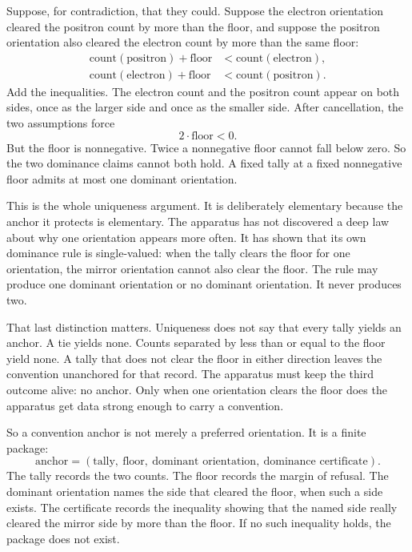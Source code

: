 Suppose, for contradiction, that they could. Suppose the electron orientation
cleared the positron count by more than the floor, and suppose the positron
orientation also cleared the electron count by more than the same floor:
\[
\begin{aligned}
  \mathrm{count}(\text{positron}) + \text{floor}
    &< \mathrm{count}(\text{electron}),\\
  \mathrm{count}(\text{electron}) + \text{floor}
    &< \mathrm{count}(\text{positron}).
\end{aligned}
\]
Add the inequalities. The electron count and the positron count appear on both
sides, once as the larger side and once as the smaller side. After cancellation,
the two assumptions force
\[
  2\cdot \text{floor} < 0.
\]
But the floor is nonnegative. Twice a nonnegative floor cannot fall below zero.
So the two dominance claims cannot both hold. A fixed tally at a fixed
nonnegative floor admits at most one dominant orientation.

This is the whole uniqueness argument. It is deliberately elementary because the
anchor it protects is elementary. The apparatus has not discovered a deep law
about why one orientation appears more often. It has shown that its own
dominance rule is single-valued: when the tally clears the floor for one
orientation, the mirror orientation cannot also clear the floor. The rule may
produce one dominant orientation or no dominant orientation. It never produces
two.

That last distinction matters. Uniqueness does not say that every tally yields
an anchor. A tie yields none. Counts separated by less than or equal to the
floor yield none. A tally that does not clear the floor in either direction
leaves the convention unanchored for that record. The apparatus must keep the
third outcome alive: no anchor. Only when one orientation clears the floor does
the apparatus get data strong enough to carry a convention.

So a convention anchor is not merely a preferred orientation. It is a finite
package:
\[
  \text{anchor}
  =
  (\text{tally},\ \text{floor},\ \text{dominant orientation},\
    \text{dominance certificate}).
\]
The tally records the two counts. The floor records the margin of refusal. The
dominant orientation names the side that cleared the floor, when such a side
exists. The certificate records the inequality showing that the named side
really cleared the mirror side by more than the floor. If no such inequality
holds, the package does not exist.

